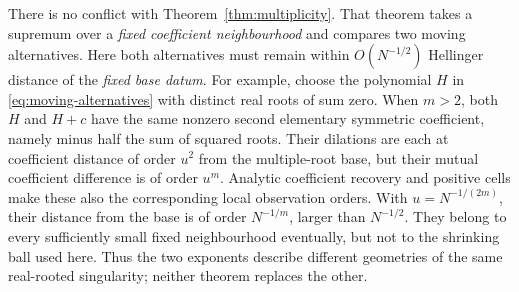There is no conflict with Theorem~\ref{thm:multiplicity}. That theorem
takes a supremum over a \emph{fixed coefficient neighbourhood} and
compares two moving alternatives. Here both alternatives must remain
within $O(N^{-1/2})$ Hellinger distance of the \emph{fixed base datum}.
For example, choose the polynomial $H$ in
\eqref{eq:moving-alternatives} with distinct real roots of sum zero.
When $m>2$, both $H$ and $H+c$ have the same nonzero second elementary
symmetric coefficient, namely minus half the sum of squared roots.
Their dilations are each at coefficient distance of order $u^2$ from
the multiple-root base, but their mutual coefficient difference is
of order $u^m$. Analytic coefficient recovery and positive cells make
these also the corresponding local observation orders. With
$u=N^{-1/(2m)}$, their distance from the base is of order $N^{-1/m}$,
larger than $N^{-1/2}$. They belong to every sufficiently small fixed
neighbourhood eventually, but not to the shrinking ball used here.
Thus the two exponents describe different geometries of the same
real-rooted singularity; neither theorem replaces the other.
